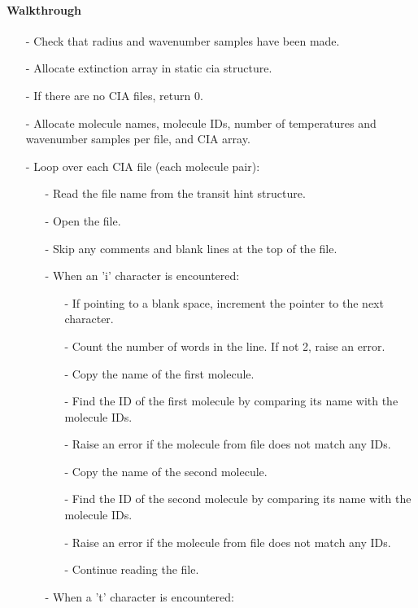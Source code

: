 \documentclass[letterpaper,12pt]{article}
\begin{document}
\paragraph{Walkthrough}
\begin{enumerate}[leftmargin=10pt, noitemsep, parsep=0pt, topsep=0ex]
\item[-] Check that radius and wavenumber samples have been made.
\item[-] Allocate extinction array in static cia structure.
\item[-] If there are no CIA files, return 0.
\item[-] Allocate molecule names, molecule IDs, number of temperatures and wavenumber samples per file, and CIA array.
\item[-] Loop over each CIA file (each molecule pair):
\begin{enumerate}[leftmargin=10pt, noitemsep, parsep=0pt, topsep=0ex]
\item[-] Read the file name from the transit hint structure.
\item[-] Open the file.
\item[-] Skip any comments and blank lines at the top of the file.
\item[-] When an 'i' character is encountered:
\begin{enumerate}[leftmargin=10pt, noitemsep, parsep=0pt, topsep=0ex]
\item[-] If pointing to a blank space, increment the pointer to the next character.
\item[-] Count the number of words in the line. If not 2, raise an error.
\item[-] Copy the name of the first molecule.
\item[-] Find the ID of the first molecule by comparing its name with the molecule IDs.
\item[-] Raise an error if the molecule from file does not match any IDs.
\item[-] Copy the name of the second molecule.
\item[-] Find the ID of the second molecule by comparing its name with the molecule IDs.
\item[-] Raise an error if the molecule from file does not match any IDs.
\item[-] Continue reading the file.
\end{enumerate}
\item[-] When a 't' character is encountered:
\begin{enumerate}[leftmargin=10pt, noitemsep, parsep=0pt, topsep=0ex]

\end{enumerate}
\end{enumerate}
\end{enumerate}
\end{document}
